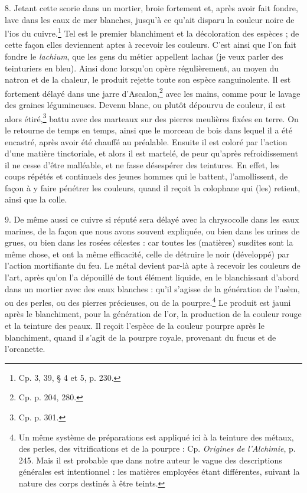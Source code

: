 \documentclass[a4paper, 11pt, oneside, polutonikogreek, french]{article}
\begin{document}
8. Jetant cette scorie dans un mortier, broie fortement et, après avoir fait fondre, lave dans les eaux de mer blanches, jusqu'à ce qu'ait disparu la couleur noire de l'ios du cuivre.\footnote{Cp. 3, 39, § 4 et 5, p. 230.} Tel est le premier blanchiment et la décoloration des espèces ; de cette façon elles deviennent aptes à recevoir les couleurs. C'est ainsi que l'on fait fondre le \emph{lachium}, que les gens du métier appellent lachas (je veux parler des teinturiers en bleu). Ainsi donc lorsqu'on opère régulièrement, au moyen du natron et de la chaleur, le produit rejette toute son espèce sanguinolente. Il est fortement délayé dans une jarre d'Ascalon,\footnote{Cp. p. 204, 280.} avec les mains, comme pour le lavage des graines légumineuses. Devenu blanc, ou plutôt dépourvu de couleur, il est alors étiré,\footnote{Cp. p. 301.} battu avec des marteaux sur des pierres meulières fixées en terre. On le retourne de temps en temps, ainsi que le morceau de bois dans lequel il a été encastré, après avoir été chauffé au préalable. Ensuite il est coloré par l'action d'une matière tinctoriale, et alors il est martelé, de peur qu'après refroidissement il ne cesse d'être malléable, et ne fasse désespérer des teintures. En effet, les coups répétés et continuels des jeunes hommes qui le battent, l'amollissent, de façon à y faire pénétrer les couleurs, quand il reçoit la colophane qui (les) retient, ainsi que la colle.

9. De même aussi ce cuivre si réputé sera délayé avec la chrysocolle dans les eaux marines, de la façon que nous avons souvent expliquée, ou bien dans les urines de grues, ou bien dans les rosées célestes : car toutes les (matières) susdites sont la même chose, et ont la même efficacité, celle de détruire le noir (développé) par l'action mortifiante du feu. Le métal devient par-là apte à recevoir les couleurs de l'art, après qu'on l'a dépouillé de tout élément liquide, en le blanchissant d'abord dans un mortier avec des eaux blanches : qu'il s'agisse de la génération de l'asèm, ou des perles, ou des pierres précieuses, ou de la pourpre.\footnote{Un même système de préparations est appliqué ici à la teinture des métaux, des perles, des vitrifications et de la pourpre : Cp. \emph{Origines de l'Alchimie}, p. 245. Mais il est probable que dans notre auteur le vague des descriptions générales est intentionnel : les matières employées étant différentes, suivant la nature des corps destinés à être teints.} Le produit est jauni après le blanchiment, pour la génération de l'or, la production de la couleur rouge et la teinture des peaux. Il reçoit l'espèce de la couleur pourpre après le blanchiment, quand il s'agit de la pourpre royale, provenant du fucus et de l'orcanette.
\end{document}
